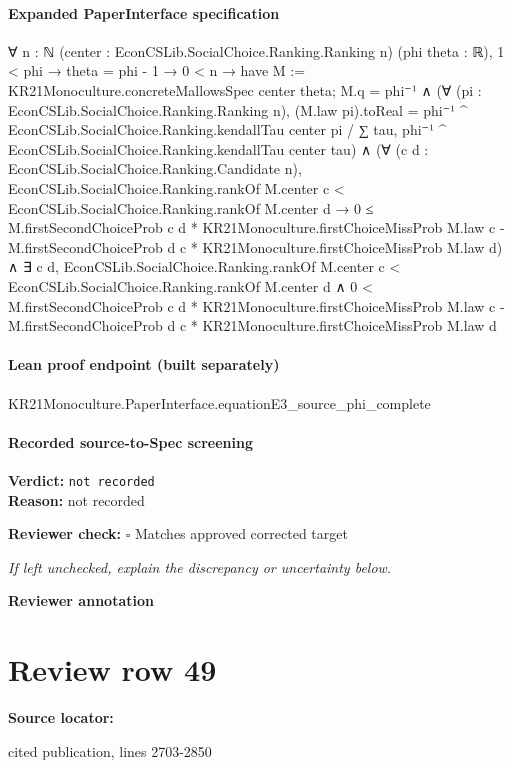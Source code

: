 \documentclass[10pt]{article}
\newcommand{\reviewerbox}{%
  \par\noindent\fbox{\parbox{0.96\linewidth}{\rule{0pt}{0.38in}}}\par
}
\newcommand{\reviewmatch}[1]{%
  \par\noindent\textbf{Reviewer check:} $\square$\; #1\par
  \noindent\emph{If left unchecked, explain the discrepancy or uncertainty below.}\par
}
\begin{document}
\paragraph{Expanded PaperInterface specification}
\begin{ReviewVerbatim}
∀ {n : ℕ} (center : EconCSLib.SocialChoice.Ranking.Ranking n) (phi theta : ℝ),
  1 < phi →
    theta = phi - 1 →
      0 < n →
        have M := KR21Monoculture.concreteMallowsSpec center theta;
        M.q = phi⁻¹ ∧
          (∀ (pi : EconCSLib.SocialChoice.Ranking.Ranking n),
              (M.law pi).toReal =
                phi⁻¹ ^ EconCSLib.SocialChoice.Ranking.kendallTau center pi /
                  ∑ tau, phi⁻¹ ^ EconCSLib.SocialChoice.Ranking.kendallTau center tau) ∧
            (∀ (c d : EconCSLib.SocialChoice.Ranking.Candidate n),
                EconCSLib.SocialChoice.Ranking.rankOf M.center c < EconCSLib.SocialChoice.Ranking.rankOf M.center d →
                  0 ≤
                    M.firstSecondChoiceProb c d * KR21Monoculture.firstChoiceMissProb M.law c -
                      M.firstSecondChoiceProb d c * KR21Monoculture.firstChoiceMissProb M.law d) ∧
              ∃ c d,
                EconCSLib.SocialChoice.Ranking.rankOf M.center c < EconCSLib.SocialChoice.Ranking.rankOf M.center d ∧
                  0 <
                    M.firstSecondChoiceProb c d * KR21Monoculture.firstChoiceMissProb M.law c -
                      M.firstSecondChoiceProb d c * KR21Monoculture.firstChoiceMissProb M.law d
\end{ReviewVerbatim}

\paragraph{Lean proof endpoint (built separately)}\begin{ReviewVerbatim}
KR21Monoculture.PaperInterface.equationE3_source_phi_complete
\end{ReviewVerbatim}

\paragraph{Recorded source-to-Spec screening}
\textbf{Verdict:} \texttt{not recorded}
\\
\textbf{Reason:} not recorded
\reviewmatch{Matches approved corrected target}
\noindent\textbf{Reviewer annotation}\par
\reviewerbox
\clearpage
\hypertarget{source-claim-f5654e8ee63c4d5d}{}
\section*{Review row 49}
\textbf{Source locator:} {\footnotesize\raggedright cited publication, lines 2703-\allowbreak{}2850\par}
\end{document}
